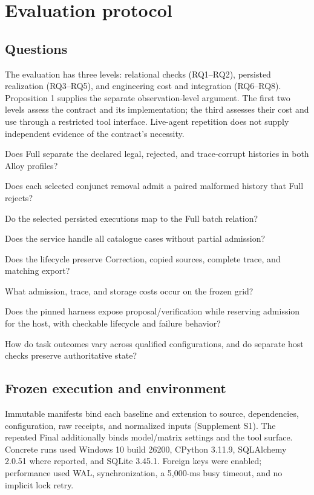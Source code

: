 \section{Evaluation protocol}
\label{sec:evaluation}

\subsection{Questions}

The evaluation has three levels: relational checks (RQ1--RQ2), persisted realization (RQ3--RQ5), and engineering cost and integration (RQ6--RQ8). Proposition 1 supplies the separate observation-level argument. The first two levels assess the contract and its implementation; the third assesses their cost and use through a restricted tool interface. Live-agent repetition does not supply independent evidence of the contract's necessity.
\begin{description}[leftmargin=2.6em,labelwidth=2.1em]
\item[RQ1] Does Full separate the declared legal, rejected, and trace-corrupt histories in both Alloy profiles?
\item[RQ2] Does each selected conjunct removal admit a paired malformed history that Full rejects?
\item[RQ3] Do the selected persisted executions map to the Full batch relation?
\item[RQ4] Does the service handle all catalogue cases without partial admission?
\item[RQ5] Does the lifecycle preserve Correction, copied sources, complete trace, and matching export?
\item[RQ6] What admission, trace, and storage costs occur on the frozen grid?
\item[RQ7] Does the pinned harness expose proposal/verification while reserving admission for the host, with checkable lifecycle and failure behavior?
\item[RQ8] How do task outcomes vary across qualified configurations, and do separate host checks preserve authoritative state?
\end{description}

\subsection{Frozen execution and environment}

Immutable manifests bind each baseline and extension to source, dependencies, configuration, raw receipts, and normalized inputs (Supplement S1). The repeated Final additionally binds model/matrix settings and the tool surface. Concrete runs used Windows 10 build 26200, CPython 3.11.9, SQLAlchemy 2.0.51 where reported, and SQLite 3.45.1. Foreign keys were enabled; performance used WAL,  synchronization, a 5,000-ms busy timeout, and no implicit lock retry.

